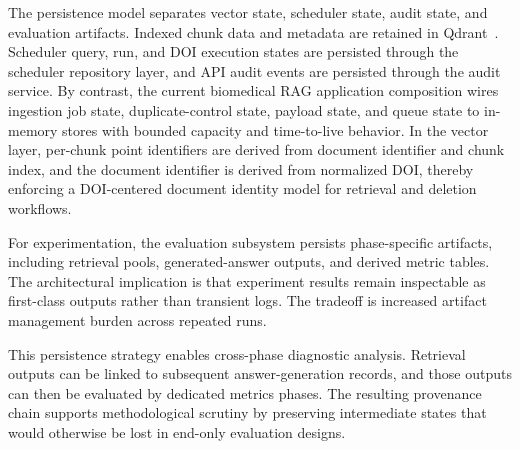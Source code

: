 The persistence model separates vector state, scheduler state, audit state, and evaluation artifacts. Indexed chunk data and metadata are retained in Qdrant~\cite{qdrant2026collections}. Scheduler query, run, and DOI execution states are persisted through the scheduler repository layer, and API audit events are persisted through the audit service. By contrast, the current biomedical RAG application composition wires ingestion job state, duplicate-control state, payload state, and queue state to in-memory stores with bounded capacity and time-to-live behavior. In the vector layer, per-chunk point identifiers are derived from document identifier and chunk index, and the document identifier is derived from normalized DOI, thereby enforcing a DOI-centered document identity model for retrieval and deletion workflows.

For experimentation, the evaluation subsystem persists phase-specific artifacts, including retrieval pools, generated-answer outputs, and derived metric tables. The architectural implication is that experiment results remain inspectable as first-class outputs rather than transient logs. The tradeoff is increased artifact management burden across repeated runs.

This persistence strategy enables cross-phase diagnostic analysis. Retrieval outputs can be linked to subsequent answer-generation records, and those outputs can then be evaluated by dedicated metrics phases. The resulting provenance chain supports methodological scrutiny by preserving intermediate states that would otherwise be lost in end-only evaluation designs.

